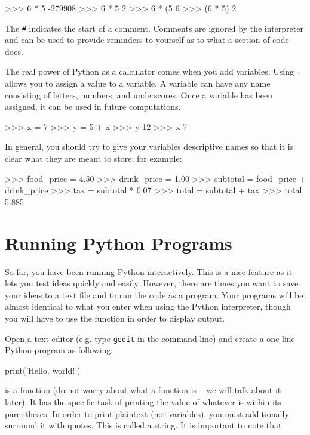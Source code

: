 \documentclass[11pt]{cselabheader}
\begin{document}
\begin{pyconcode}
>>> 6 * 5 %
-279908
>>> 6 * 5 %
2
>>> 6 * (5 %
6
>>> (6 * 5) %
2
\end{pyconcode}

The \texttt{\#} indicates the start of a comment. Comments are ignored by the
interpreter and can be used to provide reminders to yourself as to what a
section of code does.

The real power of Python as a calculator comes when you add variables. Using
\texttt{=} allows you to assign a value to a variable. A variable can have any
name consisting of letters, numbers, and underscores. Once a variable has been
assigned, it can be used in future computations.

\begin{pyconcode}
>>> x = 7
>>> y = 5 + x
>>> y
12
>>> x
7
\end{pyconcode}

In general, you should try to give your variables descriptive names so that it is
clear what they are meant to store; for example:

\begin{pyconcode}
>>> food_price = 4.50
>>> drink_price = 1.00
>>> subtotal = food_price + drink_price
>>> tax = subtotal * 0.07
>>> total = subtotal + tax
>>> total
5.885
\end{pyconcode}

\pagebreak
\section{Running Python Programs}

So far, you have been running Python interactively. This is a nice feature as it
lets you test ideas quickly and easily. However, there are times you want to
save your ideas to a text file and to run the code as a program. Your programs
will be almost identical to what you enter when using the Python interpreter,
though you will have to use the  function in order to display
output.

Open a text editor (e.g. type \texttt{gedit} in the command line) and create a
one line Python program as following:

\begin{python3code}
print('Hello, world!')
\end{python3code}

 is a function (do not worry about what a function is -- we
will talk about it later).
It has the specific task of printing the value of whatever is within its
parentheses. In order to print plaintext (not variables), you must additionally
surround it with quotes. This is called a string. It is important to note that
\end{document}
